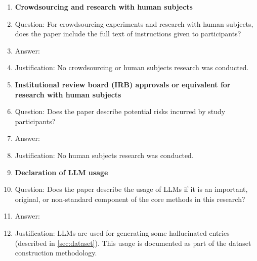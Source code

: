 \begin{enumerate}
\item {\bf Crowdsourcing and research with human subjects}
    \item[] Question: For crowdsourcing experiments and research with human subjects, does the paper include the full text of instructions given to participants?
    \item[] Answer: \answerNA{}
    \item[] Justification: No crowdsourcing or human subjects research was conducted.

\item {\bf Institutional review board (IRB) approvals or equivalent for research with human subjects}
    \item[] Question: Does the paper describe potential risks incurred by study participants?
    \item[] Answer: \answerNA{}
    \item[] Justification: No human subjects research was conducted.

\item {\bf Declaration of LLM usage}
    \item[] Question: Does the paper describe the usage of LLMs if it is an important, original, or non-standard component of the core methods in this research?
    \item[] Answer: \answerYes{}
    \item[] Justification: LLMs are used for generating some hallucinated entries (described in \cref{sec:dataset}). This usage is documented as part of the dataset construction methodology.

\end{enumerate}
